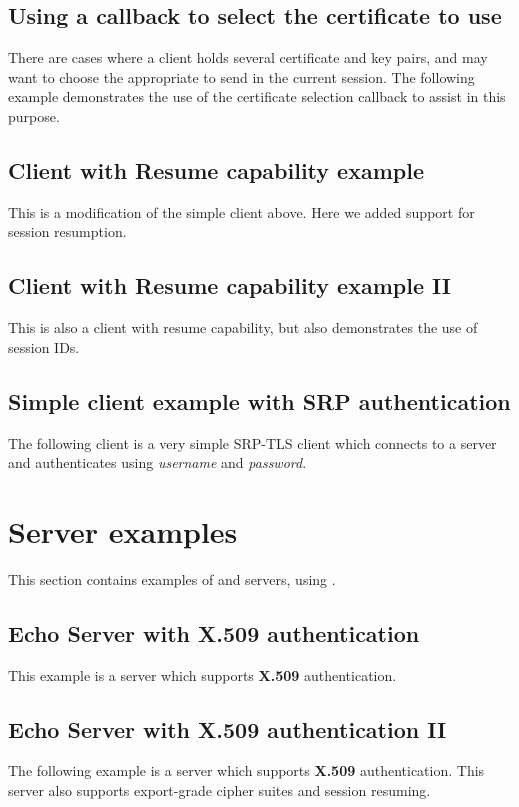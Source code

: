 \subsection{Using a callback to select the certificate to use}
There are cases where a client holds several certificate and key pairs,
and may want to choose the appropriate to send in the current session.
The following example demonstrates the use of the certificate selection callback
to assist in this purpose.
\par




\subsection{Client with Resume capability example}
\label{resume-example}
This is a modification of the simple client above. Here we added support 
for session resumption.


\subsection{Client with Resume capability example II}
\label{resume-example2}
This is also a client with resume capability, but also demonstrates
the use of session IDs.


\subsection{Simple client example with SRP authentication}
The following client
is a very simple SRP-TLS client which connects to a server 
and authenticates using {\it username} and {\it password}.



\section{Server examples}
This section contains examples of \tls{} and \ssl{} servers, using \gnutls{}.

\subsection{Echo Server with X.509 authentication}
This example is a server which supports {\bf X.509} authentication.


\subsection{Echo Server with X.509 authentication II}
The following example is a server which supports {\bf X.509} authentication.
This server also supports export-grade cipher suites and session resuming.


